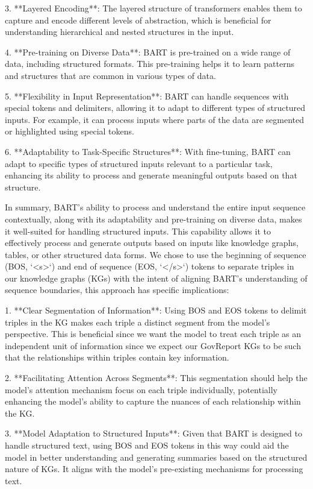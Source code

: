 \documentclass[12pt]{article}
\begin{document}
3. **Layered Encoding**: The layered structure of transformers enables them to capture and encode different levels of abstraction, which is beneficial for understanding hierarchical and nested structures in the input.


4. **Pre-training on Diverse Data**: BART is pre-trained on a wide range of data, including structured formats. This pre-training helps it to learn patterns and structures that are common in various types of data.


5. **Flexibility in Input Representation**: BART can handle sequences with special tokens and delimiters, allowing it to adapt to different types of structured inputs. For example, it can process inputs where parts of the data are segmented or highlighted using special tokens.


6. **Adaptability to Task-Specific Structures**: With fine-tuning, BART can adapt to specific types of structured inputs relevant to a particular task, enhancing its ability to process and generate meaningful outputs based on that structure.


In summary, BART's ability to process and understand the entire input sequence contextually, along with its adaptability and pre-training on diverse data, makes it well-suited for handling structured inputs. This capability allows it to effectively process and generate outputs based on inputs like knowledge graphs, tables, or other structured data forms.
We chose to use the beginning of sequence (BOS, `<s>`) and end of sequence (EOS, `</s>`) tokens to separate triples in our knowledge graphs (KGs) with the intent of aligning BART's understanding of sequence boundaries, this approach has specific implications:


1. **Clear Segmentation of Information**: Using BOS and EOS tokens to delimit triples in the KG makes each triple a distinct segment from the model's perspective. This is beneficial since we want the model to treat each triple as an independent unit of information since we expect our GovReport KGs to be such that the relationships within triples contain key information.


2. **Facilitating Attention Across Segments**: This segmentation should help the model's attention mechanism focus on each triple individually, potentially enhancing the model's ability to capture the nuances of each relationship within the KG.


3. **Model Adaptation to Structured Inputs**: Given that BART is designed to handle structured text, using BOS and EOS tokens in this way could aid the model in better understanding and generating summaries based on the structured nature of KGs. It aligns with the model's pre-existing mechanisms for processing text.
\end{document}
